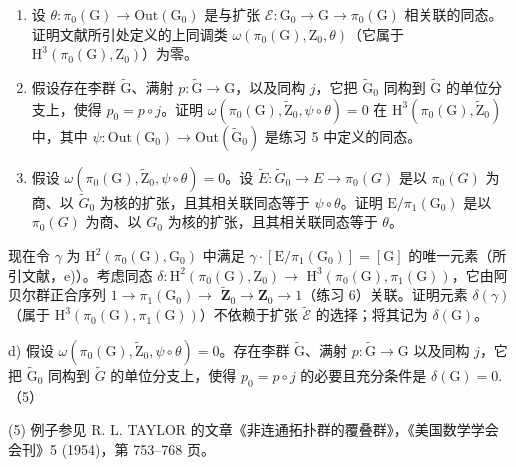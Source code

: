\begin{enumerate}
\def\labelenumi{\alph{enumi})}
\item
  设 \(\theta\colon\pi_{0}(\mathrm{G})\to\mathrm{Out}(\mathrm{G}_{0})\) 是与扩张 \(\mathcal{E}\colon\mathrm{G}_{0}\to\mathrm{G}\to\pi_{0}(\mathrm{G})\) 相关联的同态。证明文献所引处定义的上同调类 \(\omega(\pi_{0}(\mathrm{G}),\mathrm{Z}_{0},\theta)\)（它属于 \(\mathrm{H}^{3}(\pi_{0}(\mathrm{G}),\mathrm{Z}_{0})\)）为零。
\item
  假设存在李群 \(\widetilde{\mathrm{G}}\)、满射 \(p\colon\widetilde{\mathrm{G}}\to\mathrm{G}\)，以及同构 \(j\)，它把 \(\widetilde{\mathrm{G}}_{0}\) 同构到 \(\widetilde{\mathrm{G}}\) 的单位分支上，使得 \(p_{0}=p\circ j\)。证明 \(\omega(\pi_{0}(\mathrm{G}),\widetilde{\mathrm{Z}}_{0},\psi\circ\theta)=0\) 在 \(\mathrm{H}^{3}(\pi_{0}(\mathrm{G}),\widetilde{\mathrm{Z}}_{0})\) 中，其中 \(\psi\colon\mathrm{Out}(\mathrm{G}_{0})\to\mathrm{Out}(\widetilde{\mathrm{G}}_{0})\) 是练习 5 中定义的同态。
\item
  假设 \(\omega(\pi_{0}(\mathrm{G}),\widetilde{\mathrm{Z}}_{0},\psi\circ\theta)=0\)。设 \(\widetilde{E}\colon\widetilde{G}_{0}\to E\to\pi_{0}(G)\) 是以 \(\pi_{0}(G)\) 为商、以 \(\widetilde{G}_{0}\) 为核的扩张，且其相关联同态等于 \(\psi\circ\theta\)。证明 \(\mathrm{E}/\pi_{1}(\mathrm{G}_{0})\) 是以 \(\pi_{0}(G)\) 为商、以 \(G_{0}\) 为核的扩张，且其相关联同态等于 \(\theta\)。
\end{enumerate}

现在令 \(\gamma\) 为 \(\mathrm{H}^2 (\pi_0(\mathrm{G}),\mathrm{G}_0)\) 中满足 \(\gamma \cdot [\mathrm{E} / \pi_1(\mathrm{G}_0)] = [\mathrm{G}]\) 的唯一元素（所引文献，e)）。考虑同态 \(\delta \colon \mathrm{H}^2 (\pi_0(\mathrm{G}),\mathrm{Z}_0)\to\) \(\mathrm{H}^3 (\pi_0(\mathrm{G}),\pi_1(\mathrm{G}))\)，它由阿贝尔群正合序列 \(1\to \pi_1(\mathrm{G}_0)\to\) \(\widetilde{\mathbf{Z}}_0\to \mathbf{Z}_0\to 1\)（练习 6）关联。证明元素 \(\delta (\gamma)\)（属于 \(\mathrm{H}^3 (\pi_0(\mathrm{G}),\pi_1(\mathrm{G}))\)）不依赖于扩张 \(\widetilde{\mathcal{E}}\) 的选择；将其记为 \(\delta (\mathrm{G})\)。

d) 假设 \(\omega (\pi_0(\mathrm{G}),\widetilde{\mathrm{Z}}_0,\psi \circ \theta) = 0\)。存在李群 \(\widetilde{\mathrm{G}}\)、满射 \(p\colon \widetilde{\mathrm{G}}\to \mathrm{G}\) 以及同构 \(j\)，它把 \(\widetilde{\mathrm{G}}_0\) 同构到 \(\widetilde{G}\) 的单位分支上，使得 \(p_{0}=p\circ j\) 的必要且充分条件是 \(\delta(\mathrm{G})=0.\)（5）

(5) 例子参见 R. L. TAYLOR 的文章《非连通拓扑群的覆叠群》，《美国数学学会会刊》5 (1954)，第 753–768 页。

